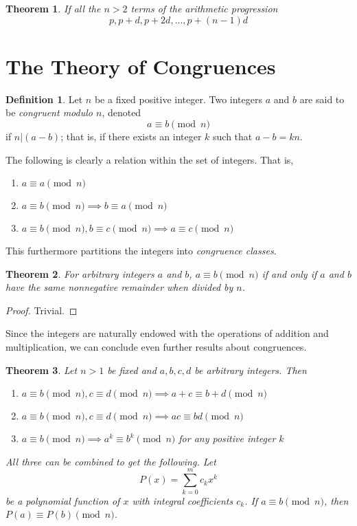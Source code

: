 \documentclass{article}
\newtheorem{theorem}{Theorem}[section]
\theoremstyle{remark}
\theoremstyle{definition}
\newtheorem{definition}{Definition}[section]
\begin{document}
\begin{theorem}
If all the $n>2$ terms of the arithmetic progression 
\[p, p+d, p+2d, ..., p + (n-1) d\]
\end{theorem}

\section{The Theory of Congruences}

\begin{definition}
Let $n$ be a fixed positive integer. Two integers $a$ and $b$ are said to be \textit{congruent modulo $n$}, denoted
\[a \equiv b \pmod{n}\]
if $n|(a-b)$; that is, if there exists an integer $k$ such that $a-b = k n$. 
\end{definition}

The following is clearly a relation within the set of integers. That is, 
\begin{enumerate}
    \item $a \equiv a \pmod{n}$
    \item $a \equiv b \pmod{n} \implies b \equiv a \pmod{n}$
    \item $a \equiv b \pmod{n}, b \equiv c \pmod{n} \implies a \equiv c \pmod{n}$
\end{enumerate} 
This furthermore partitions the integers into \textit{congruence classes}. 

\begin{theorem}
For arbitrary integers $a$ and $b$, $a \equiv b \pmod{n}$ if and only if $a$ and $b$ have the same nonnegative remainder when divided by $n$. 
\end{theorem}
\begin{proof}
Trivial.
\end{proof}

Since the integers are naturally endowed with the operations of addition and multiplication, we can conclude even further results about congruences. 

\begin{theorem}
Let $n>1$ be fixed and $a, b, c, d$ be arbitrary integers. Then 
\begin{enumerate}
    \item $a \equiv b \pmod{n}, c \equiv d \pmod{n} \implies a+c \equiv b+d \pmod{n}$
    \item $a \equiv b \pmod{n}, c \equiv d \pmod{n} \implies ac \equiv bd \pmod{n}$
    \item $a \equiv b \pmod{n} \implies a^k \equiv b^k \pmod{n}$ for any positive integer $k$
\end{enumerate}
All three can be combined to get the following. Let \[P(x) = \sum_{k=0}^m c_k x^k\] 
be a polynomial function of $x$ with integral coefficients $c_k$. If $a \equiv b \pmod{n}$, then $P(a) \equiv P(b) \pmod{n}$. 
\end{theorem}
\end{document}

